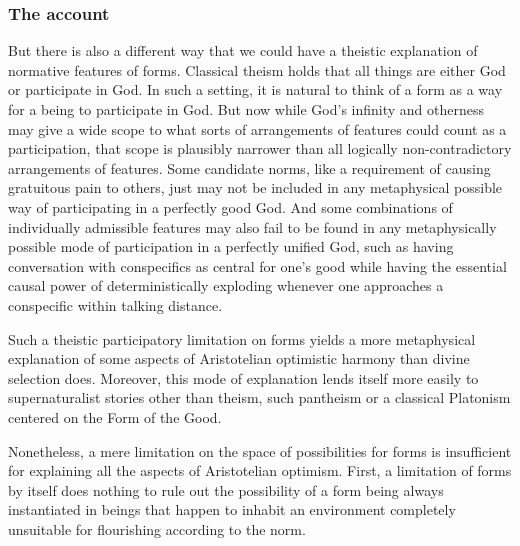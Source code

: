 \subsubsection{The account}
But there is also a different way that we could have a theistic explanation of normative features of forms. Classical theism
holds that all things are either God or participate in God. In such a setting, it is natural to think of a form as a way for 
a being to participate in God. But now while God's infinity and otherness may give a wide scope to what sorts of
arrangements of features could count as a participation, that scope is plausibly narrower than all logically non-contradictory
arrangements of features. Some candidate norms, like a requirement of causing gratuitous pain to others, just may not be included 
in any metaphysical possible way of participating in a perfectly good God. And some combinations of individually admissible features may also 
fail to be found in any metaphysically possible mode of participation in a perfectly unified God, such as having conversation with 
conspecifics as central for one's good while having the essential causal power of deterministically exploding whenever one approaches a 
conspecific within talking distance. 

Such a theistic participatory limitation on forms yields a more metaphysical explanation of some aspects of Aristotelian optimistic harmony than 
divine selection does. Moreover, this mode of explanation lends itself more easily to supernaturalist stories other than theism, 
such pantheism or a classical Platonism centered on the Form of the Good. 

Nonetheless, a mere limitation on the space of possibilities for forms is insufficient for explaining all the aspects of Aristotelian 
optimism. First, a limitation of forms by itself does nothing to rule out the possibility of a form being always instantiated in beings 
that happen to inhabit an environment completely unsuitable for flourishing according to the norm. 

